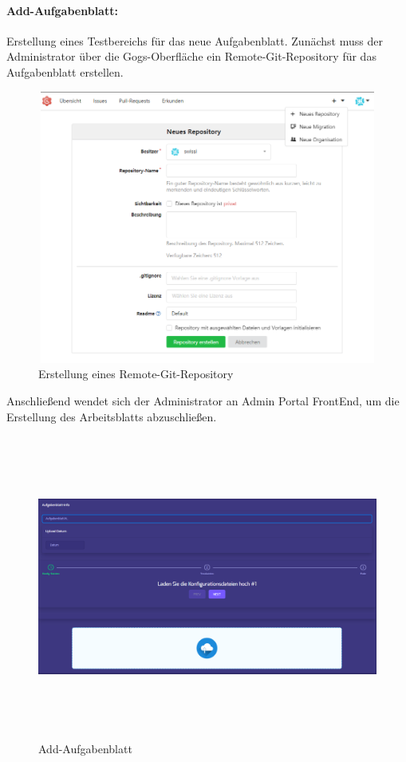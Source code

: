 \documentclass[a4paper,12pt,oneside]{book}
\begin{document}
\paragraph{Add-Aufgabenblatt: }Erstellung eines Testbereichs für das neue Aufgabenblatt.
\newline
Zunächst muss der Administrator über die Gogs-Oberfläche ein Remote-Git-Repository für das Aufgabenblatt erstellen.
\begin{figure}[h!]
	\begin{center}
		\includegraphics[width=12cm, height=9cm]{Aufgabenblatt-Git-Repo.PNG}
		\caption{Erstellung eines Remote-Git-Repository} 
		\label{Erstellung eines Remote-Git-Repository} 
	\end{center}
\end{figure}
\newpage
Anschließend wendet sich der Administrator an Admin Portal FrontEnd, um die Erstellung des Arbeitsblatts abzuschließen.
\begin{figure}[h!]
	\begin{center}
		\includegraphics[width=16cm, height=10cm]{Add-Aufgabenblatt.PNG}
		\caption{Add-Aufgabenblatt} 
		\label{Add-Aufgabenblatt} 
	\end{center}
\end{figure}
\end{document}
